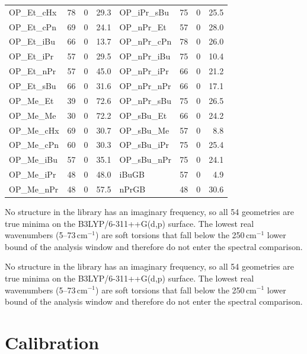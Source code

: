 \documentclass[11pt]{article}
\newcommand*\wn{\ensuremath{\text{cm}^{-1}}}
\begin{document}
{{\begin{longtable}{lrrr|lrrr}
OP\_Et\_cHx & 78 & 0 & 29.3 & OP\_iPr\_sBu & 75 & 0 & 25.5 \\
OP\_Et\_cPn & 69 & 0 & 24.1 & OP\_nPr\_Et & 57 & 0 & 28.0 \\
OP\_Et\_iBu & 66 & 0 & 13.7 & OP\_nPr\_cPn & 78 & 0 & 26.0 \\
OP\_Et\_iPr & 57 & 0 & 29.5 & OP\_nPr\_iBu & 75 & 0 & 10.4 \\
OP\_Et\_nPr & 57 & 0 & 45.0 & OP\_nPr\_iPr & 66 & 0 & 21.2 \\
OP\_Et\_sBu & 66 & 0 & 31.6 & OP\_nPr\_nPr & 66 & 0 & 17.1 \\
OP\_Me\_Et & 39 & 0 & 72.6 & OP\_nPr\_sBu & 75 & 0 & 26.5 \\
OP\_Me\_Me & 30 & 0 & 72.2 & OP\_sBu\_Et & 66 & 0 & 24.2 \\
OP\_Me\_cHx & 69 & 0 & 30.7 & OP\_sBu\_Me & 57 & 0 & 8.8 \\
OP\_Me\_cPn & 60 & 0 & 30.3 & OP\_sBu\_iPr & 75 & 0 & 25.4 \\
OP\_Me\_iBu & 57 & 0 & 35.1 & OP\_sBu\_nPr & 75 & 0 & 24.1 \\
OP\_Me\_iPr & 48 & 0 & 48.0 & iBuGB & 57 & 0 & 4.9 \\
OP\_Me\_nPr & 48 & 0 & 57.5 & nPrGB & 48 & 0 & 30.6 \\
\end{longtable}}

\begin{flushleft}\footnotesize No structure in the library has an imaginary frequency, so
all 54 geometries are true minima on the B3LYP/6-311++G(d,p) surface. The lowest real
wavenumbers (5--73\,\wn) are soft torsions
that fall below the 250\,\wn{} lower bound of the analysis window and therefore do not
enter the spectral comparison.\end{flushleft}}

\begin{flushleft}\footnotesize No structure in the library has an imaginary frequency, so
all 54 geometries are true minima on the B3LYP/6-311++G(d,p) surface. The lowest real
wavenumbers (5--73\,\wn) are soft torsions
that fall below the 250\,\wn{} lower bound of the analysis window and therefore do not
enter the spectral comparison.\end{flushleft}
\clearpage

\section{Calibration}
\label{si:calib}
\end{document}
